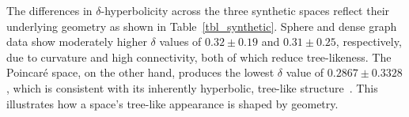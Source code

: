 \documentclass[]{Liebert_Author_revised}
\begin{document}

\begin{table}[h!]
    \centering
    \caption{Hyperbolicity $\delta$ values (average and standard deviation) for synthetically generated data.}
    \label{tbl_synthetic}
\end{table}

The differences in $\delta$-hyperbolicity across the three synthetic spaces reflect their underlying geometry as shown in Table~\ref{tbl_synthetic}. Sphere and dense graph data show moderately higher $\delta$ values of $0.32 \pm 0.19$ and $0.31 \pm 0.25$, respectively, due to curvature and high connectivity, both of which reduce tree-likeness. The Poincaré space, on the other hand, produces the lowest $\delta$ value of $0.2867 \pm 0.3328$, which is consistent with its inherently hyperbolic, tree-like structure~\citeauthor{nickel2017poincare}. This illustrates how a space's tree-like appearance is shaped by geometry.
\end{document}
